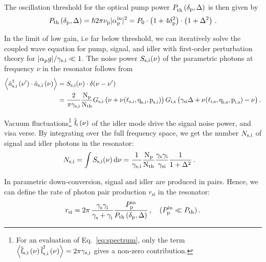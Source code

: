 \documentclass[aps,pra,showpacs,reprint,onecolumn,notitlepage]{revtex4-1}
\makeatletter
\newcommand{\avr}[1]{\mathop{\left\langle #1 \right\rangle}\nolimits}
\newcommand{\tx}[1]{\textnormal{#1}}
\def\@fnsymbol#1{\ensuremath{\ifcase#1\or *\or \dagger\or \ddagger\or
   \mathsection\or \mathparagraph\or \|\or **\or \dagger\dagger
   \or \ddagger\ddagger \else\@ctrerr\fi}}
\newcommand{\ssym}[1]{^{\@fnsymbol{#1}}}
\makeatother
\begin{document}
The oscillation threshold for the optical pump power $P^\tx{}_\textrm{th}\left( \delta_\textrm{p},\Delta\right)$ is then given by
\begin{align}
	 P_\textrm{th} \left( \delta_\textrm{p},\Delta\right) = \hslash 2 \pi \nu_\tx{p}  |\alpha^\tx{in}_\tx{p}|^2 = P_\textrm{0} \cdot \left(1 + 4 \delta_\textrm{p}^2 \right) \cdot \left(1 +  \Delta^2\right)   \,.
\label{eq:threshold}
\end{align}

In the limit of low gain, i.e far below threshold, we can iteratively solve the coupled wave equation for pump, signal, and idler with first-order perturbation theory for $|\alpha_\tx{p} g| / \gamma_\tx{s,i} \ll 1$. The noise power $S_\tx{s,i} (\nu)$ of the parametric photons at frequency $\nu$ in the resonator follows from 
\begin{alignat}{3}
	\avr{\hat{a}_\tx{s,i}\ssym{2} \left( \nu^\prime \right)\cdot \hat{a}_\tx{s,i} \left( \nu \right) } &= S_\tx{s,i} (\nu)  \cdot \delta(\nu - \nu^\prime) 
	\notag \\ 
	&=  \frac{2}{\pi \gamma_\tx{s,i}} \frac{ \tx{N}_\tx{p} }{\tx{N}_\tx{th}}  {{G}_\tx{s,i}\left( \nu + \nu (\ell_\textrm{s,i},\textrm{q}_\textrm{s,i},\textrm{p}_\textrm{s,i} ) \right)} \, {{G}_\tx{i,s} \left( \gamma_\tx{si} \Delta + \nu (\ell_\textrm{i,s},\textrm{q}_\textrm{i,s},\textrm{p}_\textrm{i,s} )  - \nu \right)}  \, .
\label{eq:spectrum}
\end{alignat} 

Vacuum fluctuations\footnote{For an evaluation of Eq.~\ref{eq:spectrum}, only the term $\avr{ \hat{\tx{f}}_\tx{s,i} \left( \nu\right) \hat{\tx{f}}_\tx{s,i} \ssym{2} \left( \nu\right) } = 2 \pi \gamma_\tx{s,i}$ gives a non-zero contribution.} $\hat{\tx{f}}_\tx{i} \left( \nu\right)$ of the idler mode drive the signal noise power, and visa verse. By integrating over the full frequency space, we get the number $N_\tx{s,i}$ of signal and idler photons in the resonator: 
\begin{align}
	N_\tx{s,i} &= \int S_\tx{s,i} (\nu) \, \tx{d} \nu = \frac{1}{\gamma_\tx{s,i}} \frac{ \tx{N}_\tx{p} }{\tx{N}_\tx{th}}  \frac{\gamma_\tx{s} \gamma_\tx{i} }{\gamma_\tx{si}} \frac{1}{1 + \Delta^2} \,  .  
	\label{eq:twophotonstate}
\end{align}

In parametric down-conversion, signal and idler are produced in pairs. Hence, we can define the rate of photon pair production ${r_\textrm{si}}{}$ in the resonator:
\begin{align}
	{r_\textrm{si}}{} = 2 \pi \,  \frac{\gamma^{}_\textrm{s} \gamma^{}_\textrm{i}}{\gamma^{}_\textrm{s} + \gamma^{}_\textrm{i}}  \frac{P^\tx{in}_\textrm{p}}{P_\textrm{th}\left( \delta_\textrm{p},\Delta \right)}  \, ,\quad (P^\tx{in}_\textrm{p} \ll P_\textrm{th})  \,.
\label{eq:rategenbelow}
\end{align}
\end{document}

